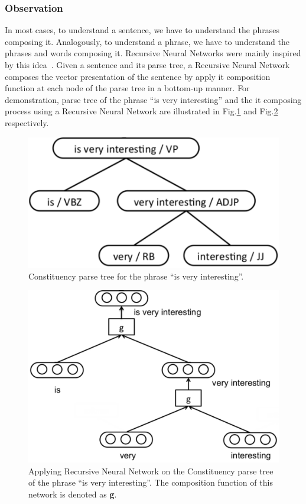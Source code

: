 \subsubsection{Observation}
In most cases, to understand a sentence, we have to understand the phrases composing it.
Analogously, to understand a phrase, we have to understand the phrases and words composing it.
Recursive Neural Networks were mainly inspired by this idea~\cite{treeLSTM}.
Given a sentence and its parse tree, a Recursive Neural Network composes the vector presentation of the sentence by apply it composition function at each node of the parse tree in a bottom-up manner.
For demonstration, parse tree of the phrase ``is very interesting'' and the it composing process using a Recursive Neural Network are illustrated in Fig.\ref{fig:example-parse} and Fig.\ref{fig:example-compose} respectively.


\begin{figure}[H]
    \centering
    \includegraphics[scale=0.5]{figure/example-parse}
    \caption[Constituency parse tree for the phrase ``is very interesting'']{Constituency parse tree for the phrase ``is very interesting''.~\cite{tag-embedding-rnn}}
    \label{fig:example-parse}
\end{figure}

\begin{figure}[H]
    \centering
    \includegraphics[scale=0.46]{figure/example-compose}
    \caption[Applying Recursive Neural Network on the phrase ``is very interesting'']{Applying Recursive Neural Network on the Constituency parse tree of the phrase ``is very interesting''. 
    The composition function of this network is denoted as \textbf{g}.}
    \label{fig:example-compose}
\end{figure}

